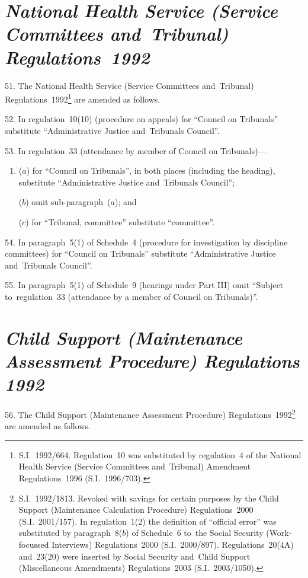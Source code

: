 \documentclass[12pt,a4paper]{article}
\begin{document}
\section*{\itshape National Health Service (Service Committees and~Tribunal) Regulations~1992}

\enlargethispage{-2\baselineskip}

51.  The National Health Service (Service Committees and~Tribunal) Regulations~1992\footnote{S.I.~1992/664. Regulation~10 was substituted by regulation~4 of the National Health Service (Service Committees and~Tribunal) Amendment Regulations~1996 (S.I.~1996/703).} are amended as follows.

\medskip

52.  In regulation~10(10) (procedure on appeals) for “Council on Tribunals” substitute “Administrative Justice and~Tribunals Council”.

\medskip

53.  In regulation~33 (attendance by member of Council on Tribunals)—
\begin{enumerate}\item[]
($a$) for “Council on Tribunals”, in both places (including the heading), substitute “Administrative Justice and~Tribunals Council”;

($b$) omit sub-paragraph~($a$); and

($c$) for “Tribunal, committee” substitute “committee”.
\end{enumerate}

\medskip

54.  In paragraph~5(1) of Schedule~4 (procedure for investigation by discipline committees) for “Council on Tribunals” substitute “Administrative Justice and~Tribunals Council”.

\medskip

55.  In paragraph~5(1) of Schedule~9 (hearings under Part III) omit “Subject to~regulation~33 (attendance by a member of Council on Tribunals)”.

\section*{\itshape\sloppy{} Child Support (Maintenance Assessment Procedure) Regulations 1992}

56.  The Child Support (Maintenance Assessment Procedure) Regulations~1992\footnote{S.I.~1992/1813. Revoked with savings for certain purposes by the Child Support (Maintenance Calculation Procedure) Regulations~2000 (S.I.~2001/157). In regulation~1(2) the definition of “official error” was substituted by paragraph~8($b$) of Schedule~6 to~the Social Security (Work-focussed Interviews) Regulations~2000 (S.I.~2000/897). Regulations~20(4A) and~23(20) were inserted by Social Security and~Child Support (Miscellaneous Amendments) Regulations~2003 (S.I.~2003/1050).} are amended as follows.
\end{document}
